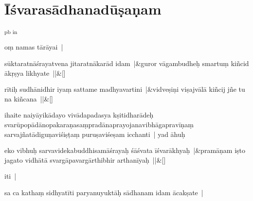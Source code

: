 \documentclass[article,12pt,a4paper]{memoir}%
\newcounter{parCount}
\begin{document}
	  
\chapter[{Īśvarasādhanadūṣaṇam}][{Īśvarasādhanadūṣaṇam}]{Īśvarasādhanadūṣaṇam}\label{īśvarasādhanadūṣaṇam}\textsuperscript{\textenglish{pb in}}\label{RNAms_18b}

	  
	  \pstart \leavevmode%
	 \label{thakur75-32.4} oṃ namas tārāyai |
	{}
	\pend%
      
	    
	    \stanza[\smallbreak]
	  \label{thakur75-32.5}sūktaratnāśrayatvena jitaratnākarād idam |&guror vāgambudheḥ smartuṃ kiñcid ākṛṣya likhyate ||\&[\smallbreak]
	  
	  
	  
	    
	    \stanza[\smallbreak]
	  rītiḥ sudhānidhir iyaṃ sattame madhyavartini |&vidveṣiṇi viṣajvālā kiñcij jñe tu na kiñcana ||\&[\smallbreak]
	  
	  
	  

	  
	  \pstart \leavevmode%
	\label{thakur75-32.9}ihaite naiyāyikādayo vivādapadasya kṣitidharādeḥ svarūpopādānopakaraṇasaṃpradānaprayojanavibhāgapravīṇaṃ sarvajñatādiguṇaviśiṣṭaṃ puruṣaviśeṣam icchanti | yad āhuḥ
	{}
	\pend%
      
	    
	    \stanza[\smallbreak]
	  \label{ratnakīrtinibandhāvali__īśvarakārikā}eko vibhuḥ sarvavidekabuddhisamāśrayaḥ śāśvata īśvarākhyaḥ |&pramāṇam iṣto jagato vidhātā svargāpavargārthibhir arthanīyaḥ ||\&[\smallbreak]
	  
	  
	  

	  
	  \pstart \leavevmode%
	iti |
	{}
	\pend%
      

	  
	  \pstart \leavevmode%
	\label{ratnakīrtinibandhāvali__36r1N6ICN8QWWKYUSP48U6N2TBT}sa ca kathaṃ sidhyatīti paryanuyuktāḥ sādhanam idam ācakṣate |
	{}
	\pend%
      
\end{document}
